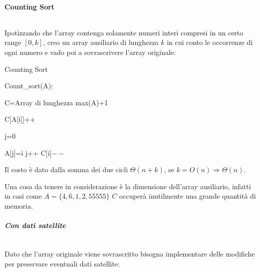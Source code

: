 \documentclass{article}
\begin{document}
\paragraph{Counting Sort} $\ $\newline

\noindent Ipotizzando che l'array contenga solamente numeri interi compresi in un certo range $[0,k]$, creo un array ausiliario di lunghezza $k$ in cui conto le occorrenze di ogni numero e vado poi a sovrascrivere l'array originale:

\begin{algorithm}[ht]
\caption{Counting Sort}
\begin{algorithmic}
\State Count\_sort(A):

    \State C=Array di lunghezza max(A)+1


        \State C[A[i]]++

    \EndFor

    \State j=0



            \State A[j]=i
            \State j++
            \State C[i]$--$

        \EndWhile

    \EndFor

\end{algorithmic}
\end{algorithm}

\noindent Il costo è dato dalla somma dei due cicli $\Theta(n+k)$, se $k=O(n)\Rightarrow \Theta(n)$.\newline

\noindent Una cosa da tenere in considerazione è la dimensione dell'array ausiliario, infatti in casi come $A=\{4,6,1,2,55555\}$ $C$ occuperà inutilmente una grande quantità di memoria.\newline

\newpage

\subparagraph{Con dati satellite} $\ $\newline

\noindent Dato che l'array originale viene sovrascritto bisogna implementare delle modifiche per preservare eventuali dati satellite:
\end{document}

